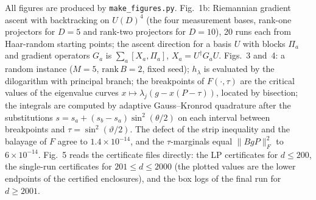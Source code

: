 \documentclass[11pt]{amsart}
\theoremstyle{definition}
\theoremstyle{remark}
\numberwithin{equation}{section}
\begin{document}
All figures are produced by \texttt{make\_figures.py}. Fig.~1b: Riemannian gradient ascent with backtracking on
$U(D)^4$ (the four measurement bases, rank-one projectors for $D=5$ and rank-two projectors for $D=10$), 20 runs each
from Haar-random starting points; the ascent direction for a basis $U$ with blocks $\Pi_a$ and gradient operators
$G_a$ is $\sum_a[X_a,\Pi_a]$, $X_a=U^\dagger G_aU$. Figs.~3 and~4: a random instance ($M=5$, $\mathrm{rank}\,B=2$, fixed
seed); $h_\lambda$ is evaluated by the dilogarithm with principal branch; the breakpoints of $F(\cdot,\tau)$ are the
critical values of the eigenvalue curves $x\mapsto\lambda_j(g-x(P-\tau))$, located by bisection; the integrals are
computed by adaptive Gauss--Kronrod quadrature after the substitutions $s=s_a+(s_b-s_a)\sin^2(\theta/2)$ on each
interval between breakpoints and $\tau=\sin^2(\vartheta/2)$. The defect of the strip inequality and the balayage of
$F$ agree to $1.4\times10^{-14}$, and the $\tau$-marginals equal $\|BgP\|_F^2$ to $6\times10^{-14}$. Fig.~5 reads the
certificate files directly: the LP certificates for $d\le200$, the single-run certificates for $201\le d\le2000$ (the
plotted values are the lower endpoints of the certified enclosures), and the box logs of the final run for $d\ge2001$.
\end{document}

